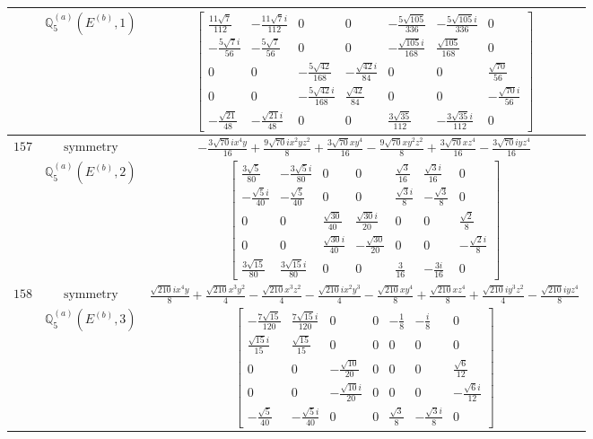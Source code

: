 \documentclass[fleqn,8pt,landscape]{jsarticle}
\begin{document}
\begin{longtable}{ccc}
$  $ & $ \mathbb{Q}_{5}^{(a)}(E^{(b)},1) $ & $ \begin{bmatrix} \frac{11 \sqrt{7}}{112} & - \frac{11 \sqrt{7} i}{112} & 0 & 0 & - \frac{5 \sqrt{105}}{336} & - \frac{5 \sqrt{105} i}{336} & 0 \\ - \frac{5 \sqrt{7} i}{56} & - \frac{5 \sqrt{7}}{56} & 0 & 0 & - \frac{\sqrt{105} i}{168} & \frac{\sqrt{105}}{168} & 0 \\ 0 & 0 & - \frac{5 \sqrt{42}}{168} & - \frac{\sqrt{42} i}{84} & 0 & 0 & \frac{\sqrt{70}}{56} \\ 0 & 0 & - \frac{5 \sqrt{42} i}{168} & \frac{\sqrt{42}}{84} & 0 & 0 & - \frac{\sqrt{70} i}{56} \\ - \frac{\sqrt{21}}{48} & - \frac{\sqrt{21} i}{48} & 0 & 0 & \frac{3 \sqrt{35}}{112} & - \frac{3 \sqrt{35} i}{112} & 0 \end{bmatrix} $ \\ \hline
$ 157 $ & $ \text{symmetry} $ & $ - \frac{3 \sqrt{70} i x^{4} y}{16} + \frac{9 \sqrt{70} i x^{2} y z^{2}}{8} + \frac{3 \sqrt{70} x y^{4}}{16} - \frac{9 \sqrt{70} x y^{2} z^{2}}{8} + \frac{3 \sqrt{70} x z^{4}}{16} - \frac{3 \sqrt{70} i y z^{4}}{16} $ \\
$  $ & $ \mathbb{Q}_{5}^{(a)}(E^{(b)},2) $ & $ \begin{bmatrix} \frac{3 \sqrt{5}}{80} & - \frac{3 \sqrt{5} i}{80} & 0 & 0 & \frac{\sqrt{3}}{16} & \frac{\sqrt{3} i}{16} & 0 \\ - \frac{\sqrt{5} i}{40} & - \frac{\sqrt{5}}{40} & 0 & 0 & \frac{\sqrt{3} i}{8} & - \frac{\sqrt{3}}{8} & 0 \\ 0 & 0 & \frac{\sqrt{30}}{40} & \frac{\sqrt{30} i}{20} & 0 & 0 & \frac{\sqrt{2}}{8} \\ 0 & 0 & \frac{\sqrt{30} i}{40} & - \frac{\sqrt{30}}{20} & 0 & 0 & - \frac{\sqrt{2} i}{8} \\ \frac{3 \sqrt{15}}{80} & \frac{3 \sqrt{15} i}{80} & 0 & 0 & \frac{3}{16} & - \frac{3 i}{16} & 0 \end{bmatrix} $ \\ \hline
$ 158 $ & $ \text{symmetry} $ & $ \frac{\sqrt{210} i x^{4} y}{8} + \frac{\sqrt{210} x^{3} y^{2}}{4} - \frac{\sqrt{210} x^{3} z^{2}}{4} - \frac{\sqrt{210} i x^{2} y^{3}}{4} - \frac{\sqrt{210} x y^{4}}{8} + \frac{\sqrt{210} x z^{4}}{8} + \frac{\sqrt{210} i y^{3} z^{2}}{4} - \frac{\sqrt{210} i y z^{4}}{8} $ \\
$  $ & $ \mathbb{Q}_{5}^{(a)}(E^{(b)},3) $ & $ \begin{bmatrix} - \frac{7 \sqrt{15}}{120} & \frac{7 \sqrt{15} i}{120} & 0 & 0 & - \frac{1}{8} & - \frac{i}{8} & 0 \\ \frac{\sqrt{15} i}{15} & \frac{\sqrt{15}}{15} & 0 & 0 & 0 & 0 & 0 \\ 0 & 0 & - \frac{\sqrt{10}}{20} & 0 & 0 & 0 & \frac{\sqrt{6}}{12} \\ 0 & 0 & - \frac{\sqrt{10} i}{20} & 0 & 0 & 0 & - \frac{\sqrt{6} i}{12} \\ - \frac{\sqrt{5}}{40} & - \frac{\sqrt{5} i}{40} & 0 & 0 & \frac{\sqrt{3}}{8} & - \frac{\sqrt{3} i}{8} & 0 \end{bmatrix} $ \\ \hline

\end{longtable}
\end{document}
